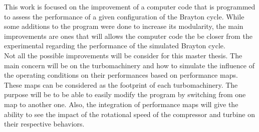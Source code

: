This work is focused on the improvement of a computer code that is programmed to assess the performance of a given configuration of the Brayton cycle. While some additions to the program were done to increase its modularity, the main improvements are ones that will allows the computer code the be closer from the experimental regarding the performance of the simulated Brayton cycle. \\

Not all the possible improvements will be consider for this master thesis. The main concern will be on the turbomachinery and how to simulate the influence of the operating conditions on their performances based on performance maps. These maps can be considered as the footprint of each turbomachinery.  The purpose will be to be able to easily modify the program by switching from one map to another one. Also, the integration of performance maps will give the ability to see the impact of the rotational speed of the compressor and turbine on their respective behaviors.


